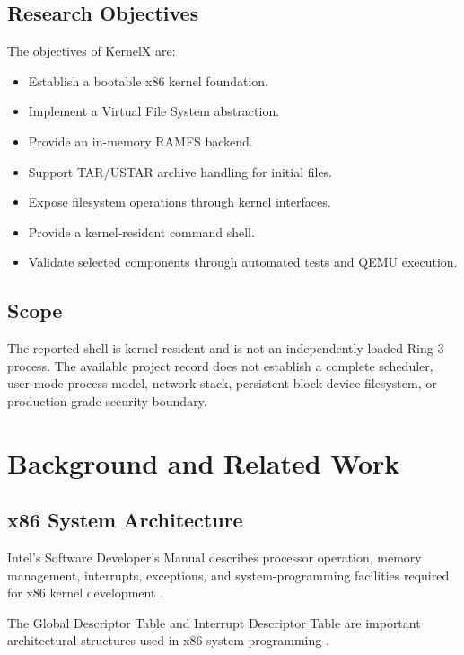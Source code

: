 \documentclass[conference]{IEEEtran}
\begin{document}
\subsection{Research Objectives}

The objectives of KernelX are:

\begin{itemize}
    \item Establish a bootable x86 kernel foundation.
    \item Implement a Virtual File System abstraction.
    \item Provide an in-memory RAMFS backend.
    \item Support TAR/USTAR archive handling for initial files.
    \item Expose filesystem operations through kernel interfaces.
    \item Provide a kernel-resident command shell.
    \item Validate selected components through automated tests
    and QEMU execution.
\end{itemize}

\subsection{Scope}

The reported shell is kernel-resident and is not an independently
loaded Ring 3 process. The available project record does not
establish a complete scheduler, user-mode process model,
network stack, persistent block-device filesystem, or
production-grade security boundary.

\section{Background and Related Work}

\subsection{x86 System Architecture}

Intel's Software Developer's Manual describes processor
operation, memory management, interrupts, exceptions, and
system-programming facilities required for x86 kernel
development \cite{intel}.

The Global Descriptor Table and Interrupt Descriptor Table
are important architectural structures used in x86 system
programming \cite{gdt,idt}.
\end{document}
